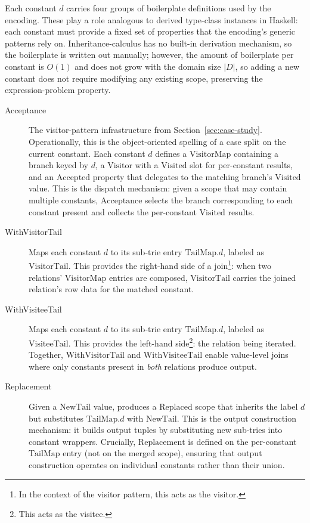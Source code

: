 Each constant $d$ carries four groups of boilerplate
definitions used by the encoding.
These play a role analogous to derived type-class instances
in Haskell: each constant must provide a fixed set of
properties that the encoding's generic patterns rely on.
Inheritance-calculus has no built-in derivation mechanism,
so the boilerplate is written out manually; however, the
amount of boilerplate per constant is $O(1)$
and does not grow with the domain size $|D|$,
so adding a new constant
does not require modifying any existing scope, preserving
the expression-problem property.


\begin{description}
  \item[Acceptance]
    The visitor-pattern infrastructure from
    Section~\ref{sec:case-study}.
    Operationally, this is the object-oriented spelling of a
    case split on the current constant.
    Each constant $d$ defines a $\mathrm{VisitorMap}$
    containing a branch keyed by $d$, a $\mathrm{Visitor}$
    with a $\mathrm{Visited}$ slot for per-constant results,
    and an $\mathrm{Accepted}$ property that delegates to the
    matching branch's $\mathrm{Visited}$ value.
    This is the dispatch mechanism: given a scope that may
    contain multiple constants, $\mathrm{Acceptance}$ selects the
    branch corresponding to each constant present and
    collects the per-constant $\mathrm{Visited}$ results.

  \item[WithVisitorTail]
    Maps each constant $d$ to its sub-trie entry
    $\mathrm{TailMap}.d$, labeled as $\mathrm{VisitorTail}$.
    This provides the right-hand side of a join\footnote{
      In the context of the visitor pattern, this acts as the visitor.
    }: when two relations' $\mathrm{VisitorMap}$ entries are
    composed, $\mathrm{VisitorTail}$ carries the joined
    relation's row data for the matched constant.

  \item[WithVisiteeTail]
    Maps each constant $d$ to its sub-trie entry
    $\mathrm{TailMap}.d$, labeled as $\mathrm{VisiteeTail}$.
    This provides the left-hand side\footnote{
      This acts as the visitee.
    }: the
    relation being iterated. Together,
    $\mathrm{WithVisitorTail}$ and $\mathrm{WithVisiteeTail}$
    enable value-level joins where only constants present
    in \emph{both} relations produce output.

  \item[Replacement]
    Given a $\mathrm{NewTail}$ value, produces a
    $\mathrm{Replaced}$ scope that inherits the label $d$
    but substitutes $\mathrm{TailMap}.d$ with
    $\mathrm{NewTail}$.
    This is the output construction mechanism: it
    builds output tuples by substituting new sub-tries into
    constant wrappers.
    Crucially, $\mathrm{Replacement}$ is defined on the
    per-constant $\mathrm{TailMap}$ entry (not on the merged
    scope), ensuring that output construction operates on
    individual constants rather than their union.
\end{description}

